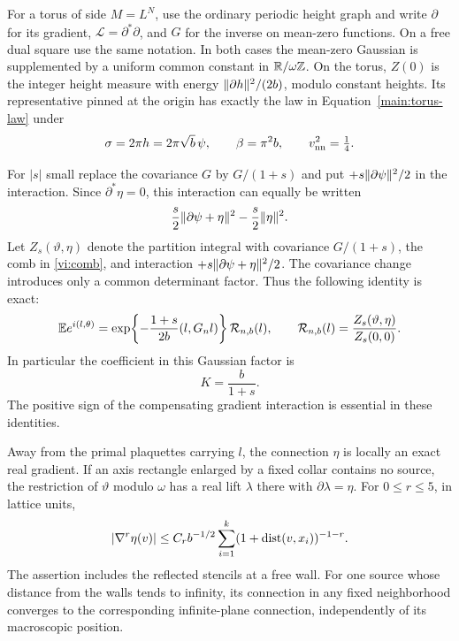 For a torus of side $M=L^N$, use the ordinary periodic height graph and
write $\partial$ for its gradient, $\mathcal L=\partial^*\partial$,
and $G$ for the inverse on mean-zero functions.  On a free dual square use
the same notation.  In both cases the mean-zero Gaussian is supplemented
by a uniform common constant in $\mathbb R/\omega\mathbb Z$.  On the torus, $Z(0)$ is
the integer height measure with energy $\lVert \partial h\rVert^2/(2b)$, modulo
constant heights.  Its representative pinned at the origin has exactly
the law in Equation~\eqref{main:torus-law} under
\begin{equation}
 \sigma=2\pi h=2\pi\sqrt b\,\psi,\qquad
 \beta=\pi^2b,\qquad v_{\mathrm{nn}}^2=\tfrac14.
 \label{vi:bare-conversion}
\end{equation}

For $|s|$ small replace the covariance $G$ by $G/(1+s)$ and put
$+s\lVert \partial\psi\rVert^2/2$ in the interaction.  Since
$\partial^*\eta=0$, this interaction can equally be written
\[
 \frac s2\lVert \partial\psi+\eta\rVert^2
       -\frac s2\lVert \eta\rVert^2.
\]
Let $Z_s(\vartheta,\eta)$ denote the partition integral with covariance
$G/(1+s)$, the comb in \eqref{vi:comb}, and interaction
$+s\lVert \partial\psi+\eta\rVert^2/2$.  The covariance change introduces only
a common determinant factor.  Thus the following identity is exact:
\begin{equation}
 \mathbb E e^{i(l,\theta)}
 =\exp\!\left\{-\frac{1+s}{2b}(l,G_nl)\right\}
   \mathcal R_{n,b}(l),\qquad
 \mathcal R_{n,b}(l)=
 \frac{Z_s(\vartheta,\eta)}{Z_s(0,0)}.
 \label{vi:compensated-duality}
\end{equation}
In particular the coefficient in this Gaussian factor is
\begin{equation}
 K=\frac b{1+s}.\label{vi:stiffness}
\end{equation}
The positive sign of the compensating gradient interaction is essential
in these identities.

\begin{lemma}\label{vi:source-lifts}
Away from the primal plaquettes carrying $l$, the connection $\eta$ is
locally an exact real gradient.  If an axis rectangle enlarged by a
fixed collar contains no source, the restriction of $\vartheta$ modulo
$\omega$ has a real lift $\lambda$ there with $\partial\lambda=\eta$.
For $0\le r\le5$, in lattice units,
\begin{equation}
 |\nabla^r\eta(v)|
 \le C_r b^{-1/2}\sum_{i=1}^k
              (1+\operatorname{dist}(v,x_i))^{-1-r}.
 \label{vi:lift-bound}
\end{equation}
The assertion includes the reflected stencils at a free wall.  For one
source whose distance from the walls tends to infinity, its connection
in any fixed neighborhood converges to the corresponding infinite-plane
connection, independently of its macroscopic position.
\end{lemma}

